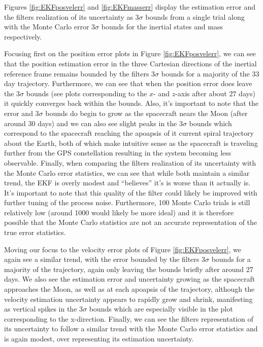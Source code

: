 \documentclass[letterpaper, paper,11pt]{AAS}		%
\begin{document}
Figures \ref{fig:EKFposvelerr} and \ref{fig:EKFmasserr} display the estimation error and the filters realization of its uncertainty as $3\sigma$ bounds from a single trial along with the Monte Carlo error $3\sigma$ bounds for the inertial states and mass respectively. 

Focusing first on the position error plots in Figure \ref{fig:EKFposvelerr}, we can see that the position estimation error in the three Cartesian directions of the inertial reference frame remains bounded by the filters $3\sigma$ bounds for a majority of the 33 day trajectory. Furthermore, we can see that when the position error does leave the $3\sigma$ bounds (see plots corresponding to the $x$- and $z$-axis after about $27$ days)  it quickly converges back within the bounds. Also, it's important to note that the error and $3\sigma$ bounds do begin to grow as the spacecraft nears the Moon (after around 30 days) and we can also see slight peaks in the $3\sigma$ bounds which correspond to the spacecraft reaching the apoapsis of it current spiral trajectory about the Earth, both of which make intuitive sense as the spacecraft is traveling further from the GPS constellation resulting in the system becoming less observable. Finally, when comparing the filters realization of its uncertainty with the Monte Carlo error statistics, we can see that while both maintain a similar trend, the EKF is overly modest and ``believes'' it's is worse than it actually is. It's important to note that this quality of the filter could likely be improved with further tuning of the process noise. Furthermore, 100 Monte Carlo trials is still relatively low (around 1000 would likely be more ideal) and it is therefore possible that the Monte Carlo statistics are not an accurate representation of the true error statistics.

Moving our focus to the velocity error plots of Figure \ref{fig:EKFposvelerr}, we again see a similar trend, with the error bounded by the filters $3\sigma$ bounds for a majority of the trajectory, again only leaving the bounds briefly after around 27 days. We also see the estimation error and uncertainty growing as the spacecraft approaches the Moon, as well as at each apoapsis of the trajectory, although the velocity estimation uncertainty appears to rapidly grow and shrink, manifesting as vertical spikes in the $3\sigma$ bounds which are especially visible in the plot corresponding to the x-direction. Finally, we can see the filters representation of its uncertainty to follow a similar trend with the Monte Carlo error statistics and is again modest, over representing its estimation uncertainty.
\end{document}
